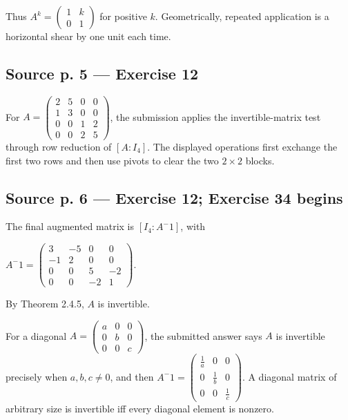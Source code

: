 Thus \(A^{k} = \begin{pmatrix}
1 & k \\
0 & 1
\end{pmatrix}\) for positive \(k\). Geometrically, repeated application is a horizontal shear by one unit each time.

\subsection{Source p. 5 --- Exercise 12}

For \(A = \begin{pmatrix}
2 & 5 & 0 & 0 \\
1 & 3 & 0 & 0 \\
0 & 0 & 1 & 2 \\
0 & 0 & 2 & 5
\end{pmatrix}\), the submission applies the invertible-matrix test through row reduction of \(\left\lbrack {A:I_{4}} \right\rbrack\). The displayed operations first exchange the first two rows and then use pivots to clear the two \(2 \times 2\) blocks.

\subsection{Source p. 6 --- Exercise 12; Exercise 34 begins}

The final augmented matrix is \(\left\lbrack {I_{4}:A^{-}1} \right\rbrack\), with

\(A^{-}1 = \begin{pmatrix}
3 & {- 5} & 0 & 0 \\
{- 1} & 2 & 0 & 0 \\
0 & 0 & 5 & {- 2} \\
0 & 0 & {- 2} & 1
\end{pmatrix}\).

By Theorem 2.4.5, \(A\) is invertible.

For a diagonal \(A = \begin{pmatrix}
a & 0 & 0 \\
0 & b & 0 \\
0 & 0 & c
\end{pmatrix}\), the submitted answer says \(A\) is invertible precisely when \(a,b,c \neq 0\), and then \(A^{-}1 = \begin{pmatrix}
\frac{1}{a} & 0 & 0 \\
0 & \frac{1}{b} & 0 \\
0 & 0 & \frac{1}{c}
\end{pmatrix}\). A diagonal matrix of arbitrary size is invertible iff every diagonal element is nonzero.

